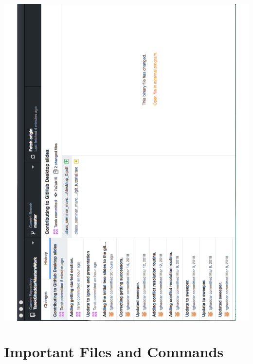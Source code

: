 \documentclass[]{beamer}
\begin{document}
\begin{frame}
\centering
\includegraphics[scale=0.39,angle=-90,origin=c]{figures/desktop_history.pdf}
\end{frame}

\section{Important Files and Commands}
\end{document}
